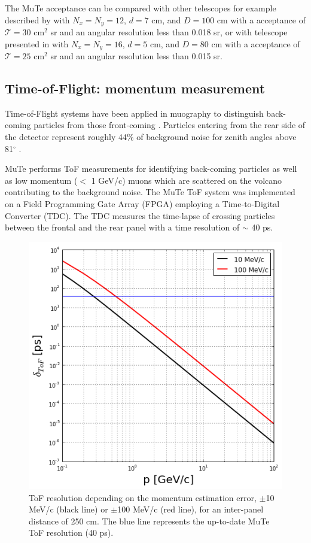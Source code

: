 \documentclass[letterpaper,11pt]{article}
\begin{document}
The MuTe acceptance can be compared with other telescopes for example described by \cite{UchidaTanakaTanaka2009space} with $N_x=N_y=12$, $d=7$ cm, and $D=100$ cm with a acceptance of $\mathcal{T}=30$ cm$^{2}$ sr and an angular resolution less than 0.018 sr, or with telescope presented in \cite{LesparreEtal2010} with $N_x=N_y=16$, $d=5$ cm, and $D=80$ cm with a acceptance of $\mathcal{T}=25$ cm$^{2}$ sr and an angular resolution less than 0.015 sr.

\subsection{Time-of-Flight: momentum measurement}

Time-of-Flight systems have been applied in muography to distinguish back-coming particles from those front-coming \cite{jourde2013experimental}. Particles entering from the rear side of the detector represent roughly 44$\%$ of background noise for zenith angles above 81$^{\circ}$ \cite{nishiyama2016monte}.

MuTe performs ToF measurements for identifying back-coming particles as well as low momentum ($<$ 1 GeV/c) muons which are scattered on the volcano contributing to the background noise. The MuTe ToF system was implemented on a Field Programming Gate Array (FPGA) employing a Time-to-Digital Converter (TDC). The TDC measures the time-lapse of crossing particles between the frontal and the rear panel with a time resolution of $\sim$ 40 ps.

\begin{figure}[htb]
\centering
\includegraphics[width=0.5\columnwidth]{Figures/ToF_Resolution_250cm.png}
\caption{ToF resolution depending on the momentum estimation error, $\pm$10 MeV/c (black line) or $\pm$100 MeV/c (red line), for an inter-panel distance of 250 cm. The blue line represents the up-to-date MuTe ToF resolution (40 ps).}
\label{fig:ToF_Resolution}
\end{figure}
\end{document}
